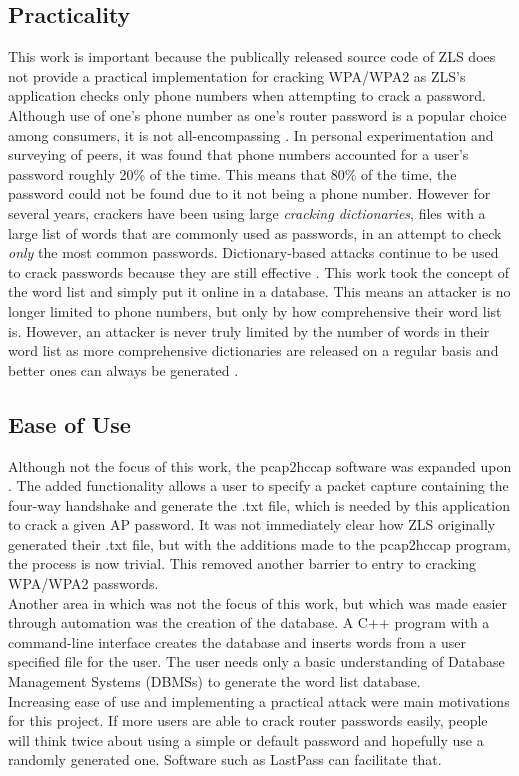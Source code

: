 \documentclass[12pt]{article}
\begin{document}
\subsection{Practicality}
\indent This work is important because the publically released source code of ZLS does not provide a practical implementation for cracking WPA/WPA2 as ZLS's application checks only phone numbers when attempting to crack a password. Although use of one's phone number as one's router password is a popular choice among consumers, it is not all-encompassing \cite{cck}. In personal experimentation and surveying of peers, it was found that phone numbers accounted for a user's password roughly 20\% of the time. This means that 80\% of the time, the password could not be found due to it not being a phone number. However for several years, crackers have been using large \emph{cracking dictionaries}, files with a large list of words that are commonly used as passwords, in an attempt to check \textit{only} the most common passwords. Dictionary-based attacks continue to be used to crack passwords because they are still effective \cite{practical}. 
\indent This work took the concept of the word list and simply put it online in a database. This means an attacker is no longer limited to phone numbers, but only by how comprehensive their word list is. However, an attacker is never truly limited by the number of words in their word list as more comprehensive dictionaries are released on a regular basis and better ones can always be generated \cite{dict}. 
\subsection{Ease of Use}
\indent Although not the focus of this work, the pcap2hccap software was expanded upon \cite{cap}. The added functionality allows a user to specify a packet capture containing the four-way handshake and generate the .txt file, which is needed by this application to crack a given AP password. It was not immediately clear how ZLS originally generated their .txt file, but with the additions made to the pcap2hccap program, the process is now trivial. This removed another barrier to entry to cracking WPA/WPA2 passwords. \\
\indent Another area in which was not the focus of this work, but which was made easier through automation was the creation of the database. A C++ program with a command-line interface creates the database and inserts words from a user specified file for the user. The user needs only a basic understanding of Database Management Systems (DBMSs) to generate the word list database.\\
\indent Increasing ease of use and implementing a practical attack were main motivations for this project. If more users are able to crack router passwords easily, people will think twice about using a simple or default password and hopefully use a randomly generated one. Software such as LastPass can facilitate that\cite{last}. 
\end{document}
